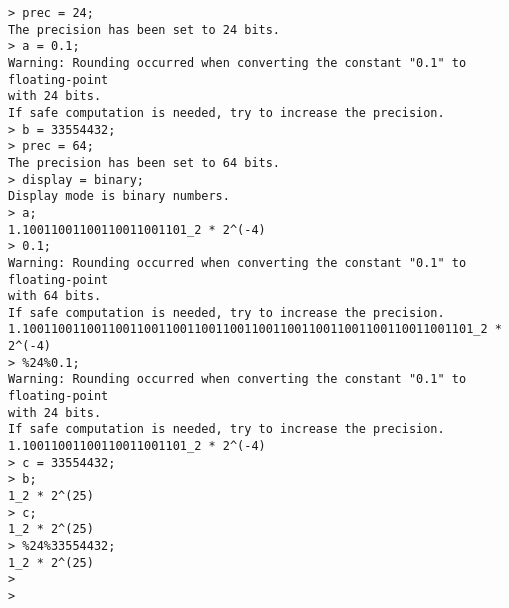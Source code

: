 \begin{center}\begin{minipage}{15cm}\begin{Verbatim}[frame=single]
> prec = 24;
The precision has been set to 24 bits.
> a = 0.1;
Warning: Rounding occurred when converting the constant "0.1" to floating-point 
with 24 bits.
If safe computation is needed, try to increase the precision.
> b = 33554432;
> prec = 64;
The precision has been set to 64 bits.
> display = binary;
Display mode is binary numbers.
> a;
1.10011001100110011001101_2 * 2^(-4)
> 0.1;
Warning: Rounding occurred when converting the constant "0.1" to floating-point 
with 64 bits.
If safe computation is needed, try to increase the precision.
1.100110011001100110011001100110011001100110011001100110011001101_2 * 2^(-4)
> %24%0.1;
Warning: Rounding occurred when converting the constant "0.1" to floating-point 
with 24 bits.
If safe computation is needed, try to increase the precision.
1.10011001100110011001101_2 * 2^(-4)
> c = 33554432;
> b;
1_2 * 2^(25)
> c;
1_2 * 2^(25)
> %24%33554432;
1_2 * 2^(25)
> 
> 
\end{Verbatim}
\end{minipage}\end{center}
